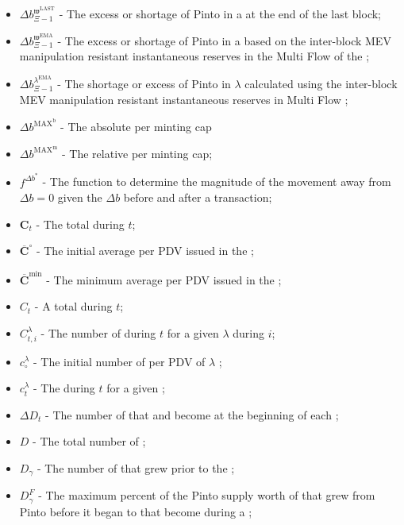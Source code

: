 \documentclass[class=article, crop=false]{standalone}
\begin{document}
\begin{itemize}[topsep=0pt, itemsep=3pt,leftmargin=16pt]
    \item[] $\Delta b_{\Xi-1}^{\mathfrak{w}^{\text{LAST}}}$ - The excess or shortage of Pinto in a  at the end of the last block;
    \item[] $\Delta b_{\Xi-1}^{\mathfrak{w}^{\text{EMA}}}$ - The excess or shortage of Pinto in a  based on the inter-block MEV manipulation resistant instantaneous reserves in the Multi Flow  of the ;
    \item[] $\Delta b_{\Xi-1}^{\lambda^{\text{EMA}}}$ - The shortage or excess of Pinto in $\lambda$ calculated using the inter-block MEV manipulation resistant instantaneous reserves in Multi Flow ;
    \item[] $\Delta b^{\text{MAX}^{\text{b}}}$ - The absolute per  minting cap
    \item[] $\Delta b^{\text{MAX}^{\text{m}}}$ - The relative per  minting cap;
    \item[] $f^{\Delta b^{*}}$ - The function to determine the magnitude of the movement away from $\Delta b = 0$ given the $\Delta b$ before and after a transaction;
    \item[] $\mathbf{C}_{t}$ - The total  during $t$;
    \item[] $\overline{\mathbf{C}}^{\circ}$ - The initial average  per PDV issued in the ;
    \item[] $\overline{\mathbf{C}}^{\text{min}}$ - The minimum average  per PDV issued in the ;
    \item[] $C_{t}$ - A  total  during $t$;
    \item[] $C_{t,i}^{\lambda}$ - The number of  during $t$ for a given $\lambda$   during $i$;
    \item[] $c_{\circ}^{\lambda}$ - The initial number of  per PDV of $\lambda$ ;
    \item[] $c_{t}^{\lambda}$ - The  during $t$ for a given ;
    \item[] $\Delta D_{t}$ - The number of  that  and become  at the beginning of each ;
    \item[] $D$ - The total number of ;
    \item[] $D_{\gamma}$ - The number of  that grew prior to the ;
    \item[] $D_{\gamma}^{F}$ - The maximum percent of the Pinto supply worth of  that grew from Pinto  before it began to  that become  during a ;

\end{itemize}
\end{document}
